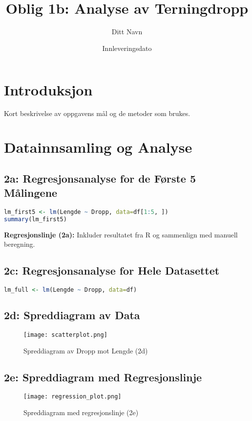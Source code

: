 \documentclass{article}
\title{Oblig 1b: Analyse av Terningdropp}
\author{Ditt Navn}
\date{Innleveringsdato}
\begin{document}
\maketitle

\section{Introduksjon}
Kort beskrivelse av oppgavens mål og de metoder som brukes.

\section{Datainnsamling og Analyse}

\subsection{2a: Regresjonsanalyse for de Første 5 Målingene}
\begin{lstlisting}[language=R]
lm_first5 <- lm(Lengde ~ Dropp, data=df[1:5, ])
summary(lm_first5)
\end{lstlisting}
\textbf{Regresjonslinje (2a):} Inkluder resultatet fra R og sammenlign med manuell beregning.

\subsection{2c: Regresjonsanalyse for Hele Datasettet}
\begin{lstlisting}[language=R]
lm_full <- lm(Lengde ~ Dropp, data=df)
\end{lstlisting}

\subsection{2d: Spreddiagram av Data}
\begin{figure}[h]
    \centering
    \texttt{[image: scatterplot.png]}
    \caption{Spreddiagram av Dropp mot Lengde (2d)}
\end{figure}

\subsection{2e: Spreddiagram med Regresjonslinje}
\begin{figure}[h]
    \centering
    \texttt{[image: regression\_plot.png]}
    \caption{Spreddiagram med regresjonslinje (2e)}
\end{figure}
\end{document}

